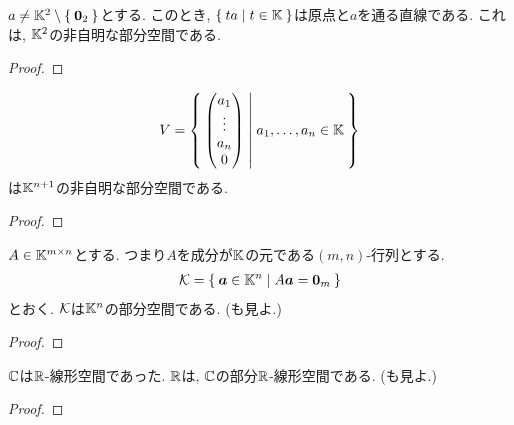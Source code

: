 \begin{example}
  $a\neq \mathbb{K}^2\setminus\Set{\boldsymbol{0}_2}$とする.
  このとき, $\Set{ta|t\in \mathbb{K}}$は原点と$a$を通る直線である.
  これは, $\mathbb{K}^2$の非自明な部分空間である.
\end{example}
\begin{proof}\end{proof}


\begin{example}
  \begin{align*}
    V=\Set{\begin{pmatrix}a_1\\\vdots\\a_n\\0\end{pmatrix}|a_1,\ldots,a_n\in\mathbb{K}}
  \end{align*}
  は$\mathbb{K}^{n+1}$の非自明な部分空間である.
\end{example}
\begin{proof}\end{proof}

\begin{example}
  \label{subsp:example:fiber}
  $A\in \mathbb{K}^{m\times n}$とする.
  つまり$A$を成分が$\mathbb{K}$の元である$(m,n)$-行列とする.
  \begin{align*}
    \mathcal{K}=\Set{\boldsymbol{a}\in \mathbb{K}^n|A\boldsymbol{a}=\boldsymbol{0}_m}
  \end{align*}
  とおく. $\mathcal{K}$は$\mathbb{K}^n$の部分空間である.
  (も見よ.)
\end{example}
\begin{proof}\end{proof}

\begin{example}
  \label{subsp:example:cc}
  $\mathbb{C}$は$\mathbb{R}$-線形空間であった.
  $\mathbb{R}$は, $\mathbb{C}$の部分$\mathbb{R}$-線形空間である.
  (も見よ.)
\end{example}
\begin{proof}\end{proof}


